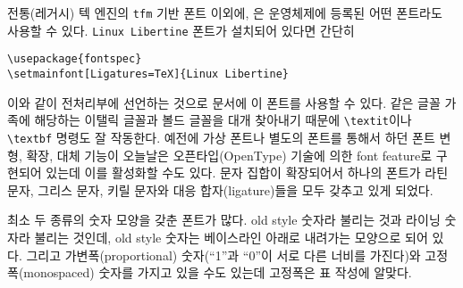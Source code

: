 전통(레거시) 텍 엔진의 \texttt{tfm} 기반 폰트 이외에, \XeLaTeX 은 운영체제에 등록된 어떤 폰트라도 사용할 수 있다. \texttt{Linux Libertine} 폰트가 설치되어 있다면 간단히 
\begin{code}
\begin{verbatim}
\usepackage{fontspec}
\setmainfont[Ligatures=TeX]{Linux Libertine}
\end{verbatim}
\end{code}
이와 같이 전처리부에 선언하는 것으로 문서에 이 폰트를 사용할 수 있다.
같은 글꼴 가족에 해당하는 이탤릭 글꼴과 볼드 글꼴을 대개 찾아내기 때문에 
\verb|\textit|이나 \verb|\textbf| 명령도 잘 작동한다.
예전에 가상 폰트나 별도의 폰트를 통해서 하던 폰트 변형, 확장, 대체 기능이 오늘날은 
오픈타입(OpenType) 기술에 의한 font feature로 구현되어 있는데 이를 활성화할 수도 있다. 문자 집합이 확장되어서 하나의 폰트가 라틴 문자, 그리스 문자, 키릴 문자와 대응 합자(ligature)들을 모두 갖추고 있게 되었다.

최소 두 종류의 숫자 모양을 갖춘 폰트가 많다. old style 숫자라 불리는 것과 라이닝 숫자라 불리는 것인데, old style 숫자는 베이스라인 아래로 내려가는 모양으로 되어 있다. 그리고 가변폭(proportional) 숫자(``1''과 ``0''이 서로 다른 너비를 가진다)와 고정폭(monospaced) 숫자를 가지고 있을 수도 있는데 고정폭은 표 작성에 알맞다.

